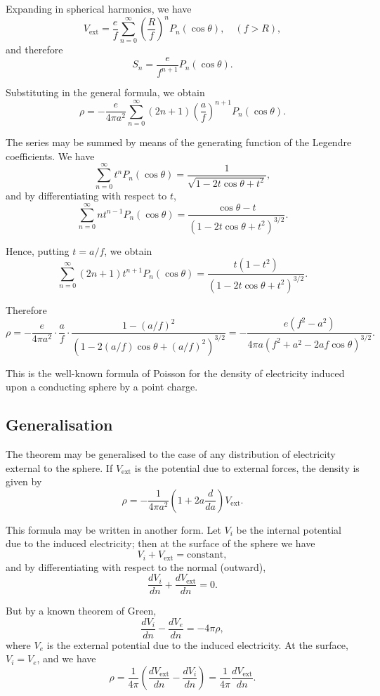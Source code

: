 \documentclass[11pt,a4paper]{article}
\begin{document}
\setcounter{page}{97}

Expanding in spherical harmonics, we have
\[
V_{\text{ext}} = \frac{e}{f} \sum_{n=0}^{\infty} \left(\frac{R}{f}\right)^n P_n(\cos\theta),
\quad (f > R),
\]
and therefore
\[
S_n = \frac{e}{f^{n+1}} P_n(\cos\theta).
\]

Substituting in the general formula, we obtain
\[
\rho = -\frac{e}{4\pi a^2} \sum_{n=0}^{\infty} (2n+1) \left(\frac{a}{f}\right)^{n+1} P_n(\cos\theta).
\]

The series may be summed by means of the generating function of the Legendre coefficients. We have
\[
\sum_{n=0}^{\infty} t^n P_n(\cos\theta) = \frac{1}{\sqrt{1-2t\cos\theta+t^2}},
\]
and by differentiating with respect to $t$,
\[
\sum_{n=0}^{\infty} n t^{n-1} P_n(\cos\theta) = \frac{\cos\theta-t}{(1-2t\cos\theta+t^2)^{3/2}}.
\]

\setcounter{page}{98}

Hence, putting $t = a/f$, we obtain
\[
\sum_{n=0}^{\infty} (2n+1) t^{n+1} P_n(\cos\theta)
= \frac{t(1-t^2)}{(1-2t\cos\theta+t^2)^{3/2}}.
\]

Therefore
\[
\rho = -\frac{e}{4\pi a^2} \cdot \frac{a}{f} \cdot \frac{1-(a/f)^2}{(1-2(a/f)\cos\theta+(a/f)^2)^{3/2}}
= -\frac{e(f^2-a^2)}{4\pi a(f^2+a^2-2af\cos\theta)^{3/2}}.
\]

This is the well-known formula of Poisson for the density of electricity induced upon a conducting sphere by a point charge.

\subsection*{Generalisation}

The theorem may be generalised to the case of any distribution of electricity external to the sphere. If $V_{\text{ext}}$ is the potential due to external forces, the density is given by
\[
\rho = -\frac{1}{4\pi a^2} \left(1 + 2a\frac{d}{da}\right) V_{\text{ext}}.
\]

\setcounter{page}{99}

This formula may be written in another form. Let $V_i$ be the internal potential due to the induced electricity; then at the surface of the sphere we have
\[
V_i + V_{\text{ext}} = \text{constant},
\]
and by differentiating with respect to the normal (outward),
\[
\frac{dV_i}{dn} + \frac{dV_{\text{ext}}}{dn} = 0.
\]

But by a known theorem of Green,
\[
\frac{dV_i}{dn} - \frac{dV_e}{dn} = -4\pi\rho,
\]
where $V_e$ is the external potential due to the induced electricity. At the surface, $V_i = V_e$, and we have
\[
\rho = \frac{1}{4\pi} \left(\frac{dV_{\text{ext}}}{dn} - \frac{dV_i}{dn}\right)
= \frac{1}{4\pi} \frac{dV_{\text{ext}}}{dn}.
\]
\end{document}
